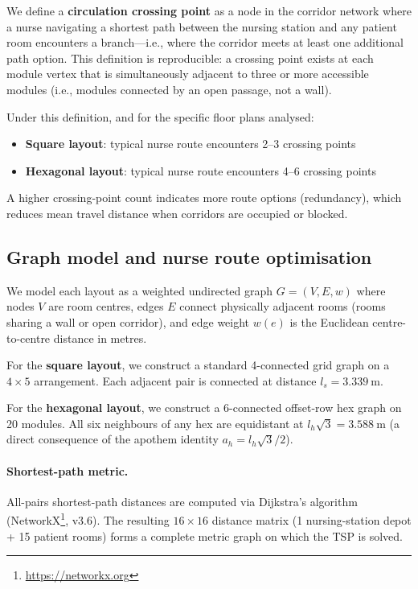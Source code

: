\documentclass[12pt,a4paper]{article}
\begin{document}
We define a \textbf{circulation crossing point} as a node in the corridor network
where a nurse navigating a shortest path between the nursing station and any
patient room encounters a branch---i.e., where the corridor meets at least one
additional path option.
This definition is reproducible: a crossing point exists at each module vertex
that is simultaneously adjacent to three or more accessible modules
(i.e., modules connected by an open passage, not a wall).

Under this definition, and for the specific floor plans analysed:
\begin{itemize}[noitemsep]
  \item \textbf{Square layout}: typical nurse route encounters 2--3 crossing points
  \item \textbf{Hexagonal layout}: typical nurse route encounters 4--6 crossing points
\end{itemize}
A higher crossing-point count indicates more route options (redundancy), which
reduces mean travel distance when corridors are occupied or blocked.

\subsection{Graph model and nurse route optimisation}
\label{sec:methods_tsp}

We model each layout as a weighted undirected graph $G=(V,E,w)$ where nodes $V$ are
room centres, edges $E$ connect physically adjacent rooms (rooms sharing a wall or
open corridor), and edge weight $w(e)$ is the Euclidean centre-to-centre distance
in metres.

For the \textbf{square layout}, we construct a standard 4-connected grid graph
on a $4 \times 5$ arrangement.
Each adjacent pair is connected at distance $l_s = \SI{3.339}{\metre}$.

For the \textbf{hexagonal layout}, we construct a 6-connected offset-row hex graph
on 20 modules.
All six neighbours of any hex are equidistant at $l_h\sqrt{3} = \SI{3.588}{\metre}$
(a direct consequence of the apothem identity $a_h = l_h\sqrt{3}/2$).

\paragraph{Shortest-path metric.}
All-pairs shortest-path distances are computed via Dijkstra's algorithm
(NetworkX\footnote{\url{https://networkx.org}}, v3.6).
The resulting $16 \times 16$ distance matrix (1 nursing-station depot + 15 patient rooms)
forms a complete metric graph on which the TSP is solved.
\end{document}
